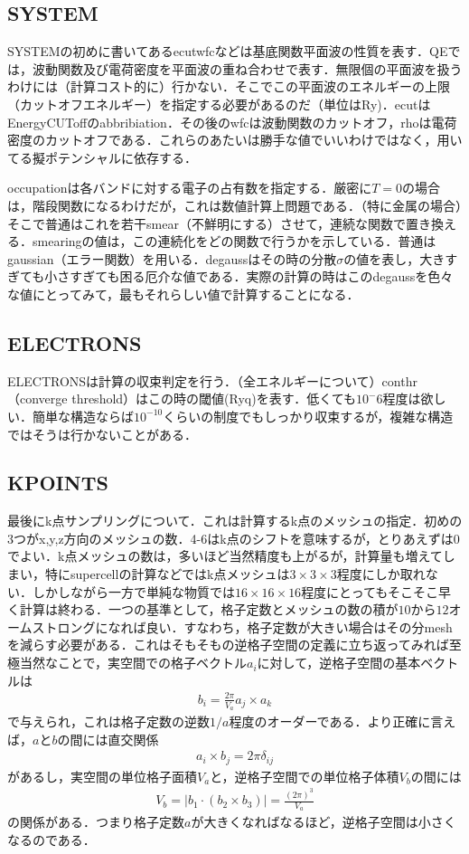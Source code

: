 \documentclass[a4j]{jarticle}
\begin{document}
  \subsection{SYSTEM}
  SYSTEMの初めに書いてあるecutwfcなどは基底関数平面波の性質を表す．QEでは，波動関数及び電荷密度を平面波の重ね合わせで表す．無限個の平面波を扱うわけには（計算コスト的に）行かない．そこでこの平面波のエネルギーの上限（カットオフエネルギー）を指定する必要があるのだ（単位はRy)．ecutはEnergyCUToffのabbribiation．その後のwfcは波動関数のカットオフ，rhoは電荷密度のカットオフである．これらのあたいは勝手な値でいいわけではなく，用いてる擬ポテンシャルに依存する．


  occupationは各バンドに対する電子の占有数を指定する．厳密に$T=0$の場合は，階段関数になるわけだが，これは数値計算上問題である．（特に金属の場合）そこで普通はこれを若干smear（不鮮明にする）させて，連続な関数で置き換える．smearingの値は，この連続化をどの関数で行うかを示している．普通はgaussian（エラー関数）を用いる．degaussはその時の分散$\sigma$の値を表し，大きすぎても小さすぎても困る厄介な値である．実際の計算の時はこのdegaussを色々な値にとってみて，最もそれらしい値で計算することになる．
  
\subsection{ELECTRONS}
  
  ELECTRONSは計算の収束判定を行う．（全エネルギーについて）conthr（converge threshold）はこの時の閾値(Ryq)を表す．低くても$10^-6$程度は欲しい．簡単な構造ならば$10^{-10}$くらいの制度でもしっかり収束するが，複雑な構造ではそうは行かないことがある．

  \subsection{KPOINTS}
  最後にk点サンプリングについて．これは計算するk点のメッシュの指定．初めの3つがx,y,z方向のメッシュの数．4-6はk点のシフトを意味するが，とりあえずは$0$でよい．k点メッシュの数は，多いほど当然精度も上がるが，計算量も増えてしまい，特にsupercellの計算などではk点メッシュは$3\times 3\times 3$程度にしか取れない．しかしながら一方で単純な物質では$16\times 16\times 16$程度にとってもそこそこ早く計算は終わる．一つの基準として，格子定数とメッシュの数の積が$10$から$12$オームストロングになれば良い．すなわち，格子定数が大きい場合はその分meshを減らす必要がある．これはそもそもの逆格子空間の定義に立ち返ってみれば至極当然なことで，実空間での格子ベクトル$a_i$に対して，逆格子空間の基本ベクトルは
  \begin{align*}
   b_i=\frac{2\pi}{V_a}a_j\times a_k
  \end{align*}
  で与えられ，これは格子定数の逆数$1/a$程度のオーダーである．より正確に言えば，$a$と$b$の間には直交関係
  \begin{align*}
   a_i\times b_j=2\pi \delta_{ij}
  \end{align*}
があるし，実空間の単位格子面積$V_a$と，逆格子空間での単位格子体積$V_b$の間には
  \begin{align*}
   V_b=|b_1\cdot (b_2\times b_3)|=\frac{(2\pi)^3}{V_a}
  \end{align*}
の関係がある．つまり格子定数$a$が大きくなればなるほど，逆格子空間は小さくなるのである．
\end{document}
